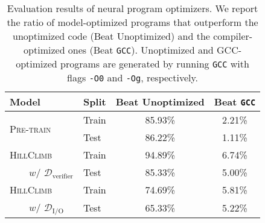 \documentclass{article}
\def\correctfuncio/{\ensuremath{\mathcal{D}_\textrm{I/O}}}
\def\correctfuncsmt/{\ensuremath{\mathcal{D}_\textrm{verifier}}}
\begin{document}
\begin{table}[t]
\small
\centering
\caption{Evaluation results of neural program optimizers. We report the ratio of model-optimized programs that outperform the unoptimized code (Beat Unoptimized) and the compiler-optimized ones (Beat \texttt{GCC}). Unoptimized and GCC-optimized programs are generated by running \texttt{GCC} with flags \texttt{-O0} and \texttt{-Og}, respectively.}
\begin{tabular}{llcc}
\toprule
\textbf{Model}                              & \textbf{Split} & \textbf{Beat Unoptimized} & \textbf{Beat \texttt{GCC}} \\ \midrule
\multirow{2}{*}{\textsc{Pre-train}}          & Train & 85.93\%          & 2.21\%   \\
                                   & Test  & 86.22\%          & 1.11\%   \\ \midrule
\textsc{HillClimb}                          & Train & 94.89\%          & 6.74\%   \\
~~~~$w$/ \correctfuncsmt/ & Test  & 85.33\%          & 5.00\%   \\ \midrule
\textsc{HillClimb}                          & Train & 74.69\%          & 5.81\%   \\
~~~~$w$/ \correctfuncio/  & Test  & 65.33\%          & 5.22\%  \\ \bottomrule 
\end{tabular}
\label{tab:z3_eval_results}
\end{table}



\end{document}
